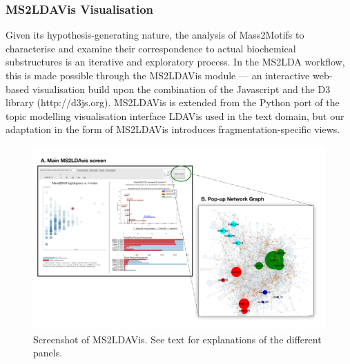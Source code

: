 \subsubsection{MS2LDAVis Visualisation\label{sub:ms2lda-visualisation}}

Given its hypothesis-generating nature, the analysis of Mass2Motifs to characterise and examine their correspondence to actual biochemical substructures is an iterative and exploratory process. In the MS2LDA workflow, this is made possible through the MS2LDAVis module --- an interactive web-based visualisation build upon the combination of the Javascript and the D3 library (http://d3js.org). MS2LDAVis is extended from the Python port of the topic modelling visualisation interface LDAVis \cite{Sievert2014} used in the text domain, but our adaptation in the form of MS2LDAVis introduces fragmentation-specific views.

\begin{figure}[!htbp]
\centering\includegraphics[width=1.0\linewidth]{07-lda/figures/figure_s3.pdf}
\centering\caption{Screenshot of MS2LDAVis. See text for explanations of the different panels.\label{fig:m2ldavis-main}}
\end{figure}

